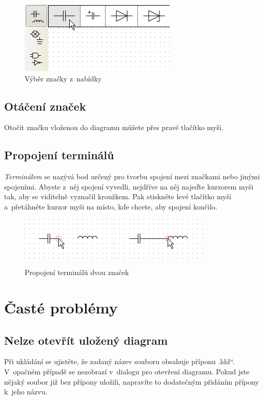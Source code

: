 \documentclass[12pt,oneside,a4paper,titlepage,final]{article}
\theoremstyle{note}
\renewcommand*{\uv}[1]{\quotedblbase #1\textquotedblleft}
\begin{document}
\begin{figure}[ht]
	\centering
	\includegraphics{select-symbol}
	\caption{Výběr značky z~nabídky}
	\label{select-symbol}
\end{figure}

\subsection{Otáčení značek}
Otočit značku vloženou do diagramu můžete přes pravé tlačítko myši.

\subsection{Propojení terminálů}
\emph{Terminálem} se nazývá bod určený pro tvorbu spojení mezi značkami nebo jinými spojeními. Abyste z~něj spojení vyvedli, nejdříve na něj najeďte kurzorem myši tak, aby se viditelně vyznačil kroužkem. Pak stiskněte levé tlačítko myši a~přetáhněte kurzor myši na místo, kde chcete, aby spojení končilo.

\begin{figure}[ht]
	\centering
	\includegraphics{create-connection-begin} \hspace{15pt} \includegraphics{create-connection-end}
	\caption{Propojení terminálů dvou značek}
	\label{create-connection}
\end{figure}

\section{Časté problémy}
\subsection{Nelze otevřít uložený diagram}
Při ukládání se ujistěte, že zadaný název souboru obsahuje příponu \uv{.ldd}. V~opačném případě se nezobrazí v~dialogu pro otevření diagramu. Pokud jste nějaký soubor již bez přípony uložili, napravíte to dodatečným přidáním přípony k~jeho názvu.
\end{document}
